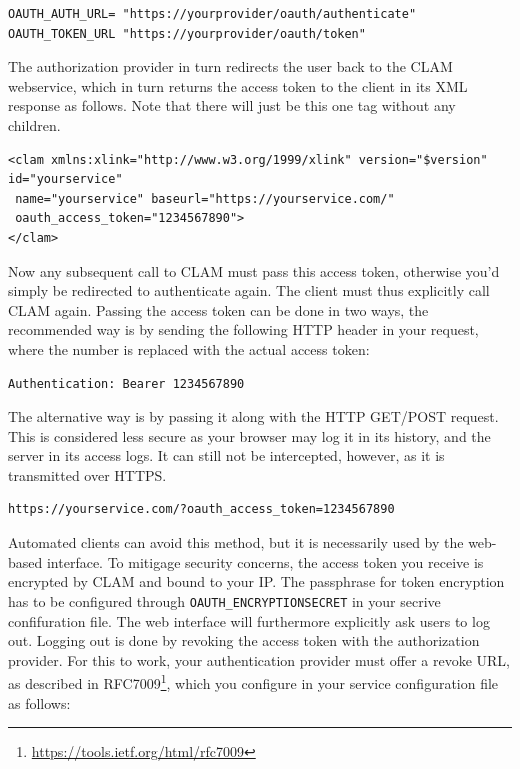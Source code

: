 \documentclass[a4paper,12pt,twoside,openright]{report}
\begin{document}
{ \small
\begin{verbatim}
OAUTH_AUTH_URL= "https://yourprovider/oauth/authenticate"
OAUTH_TOKEN_URL "https://yourprovider/oauth/token"
\end{verbatim}
}

The authorization provider in turn redirects the user back to the CLAM
webservice, which in turn returns the access token to the client in its XML
response as follows. Note that there will just be this one tag without any
children.

{ \small
\begin{verbatim}
<clam xmlns:xlink="http://www.w3.org/1999/xlink" version="$version"
id="yourservice"
 name="yourservice" baseurl="https://yourservice.com/"
 oauth_access_token="1234567890">
</clam>
\end{verbatim}
}

Now any subsequent call to CLAM must pass this access token, otherwise you'd
simply be redirected to authenticate again. The client must thus explicitly call CLAM
again. Passing the access token can be done in two ways, the recommended way is
by sending the following HTTP header in your request, where the number is
replaced with the actual access token:

{ \small
\begin{verbatim}
Authentication: Bearer 1234567890
\end{verbatim}
}

The alternative way is by passing it along with the HTTP GET/POST request. This
is considered less secure as your browser may log it in its history, and the
server in its access logs. It can still not be intercepted, however, as it is
transmitted over HTTPS.

{ \small
\begin{verbatim}
https://yourservice.com/?oauth_access_token=1234567890
\end{verbatim}
}

Automated clients can avoid this method, but it is necessarily used by the
web-based interface. To mitigage security concerns, the access token you
receive is encrypted by CLAM and bound to your IP. The passphrase for token
encryption has to be configured through \texttt{OAUTH\_ENCRYPTIONSECRET} in
your secrive confifuration file. The web interface will furthermore explicitly
ask users to log out. Logging out is done by revoking the access token with the
authorization provider. For this to work, your authentication provider must
offer a revoke URL, as described in RFC7009\footnote{
\url{https://tools.ietf.org/html/rfc7009}}, which you configure in your service
configuration file as follows:
\end{document}
